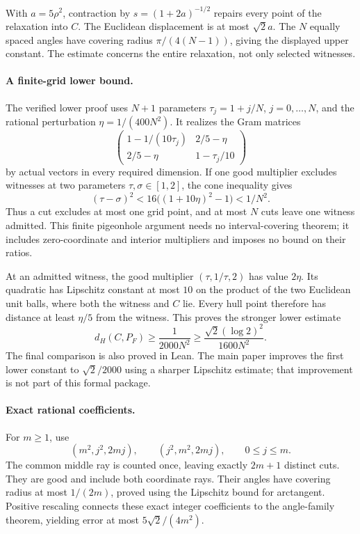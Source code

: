 With $a=5\rho^2$, contraction by $s=(1+2a)^{-1/2}$ repairs every point of
the relaxation into $C$. The Euclidean displacement is at most $\sqrt2a$.
The $N$ equally spaced angles have covering radius
$\pi/(4(N-1))$, giving the displayed upper constant. The estimate concerns
the entire relaxation, not only selected witnesses.

\paragraph{A finite-grid lower bound.}
The verified lower proof uses $N+1$ parameters
$\tau_j=1+j/N$, $j=0,\ldots,N$, and the rational perturbation
$\eta=1/(400N^2)$. It realizes the Gram matrices
\[
 \begin{pmatrix}
 1-1/(10\tau_j)&2/5-\eta\\
 2/5-\eta&1-\tau_j/10
 \end{pmatrix}
\]
by actual vectors in every required dimension. If one good multiplier
excludes witnesses at two parameters $\tau,\sigma\in[1,2]$, the cone
inequality gives
\[
 (\tau-\sigma)^2<16\bigl((1+10\eta)^2-1\bigr)<1/N^2.
\]
Thus a cut excludes at most one grid point, and at most $N$ cuts leave
one witness admitted. This finite pigeonhole argument needs no
interval-covering theorem; it includes zero-coordinate and interior
multipliers and imposes no bound on their ratios.

At an admitted witness, the good multiplier $(\tau,1/\tau,2)$ has value
$2\eta$. Its quadratic has Lipschitz constant at most $10$ on the product
of the two Euclidean unit balls, where both the witness and $C$ lie.
Every hull point therefore has distance at least $\eta/5$ from the
witness. This proves the stronger lower estimate
\[
 d_H(C,P_F)\geq\frac1{2000N^2}
 \geq\frac{\sqrt2(\log2)^2}{1600N^2}.
\]
The final comparison is also proved in Lean. The main paper improves
the first lower constant to $\sqrt2/2000$ using a sharper Lipschitz
estimate; that improvement is not part of this formal package.

\paragraph{Exact rational coefficients.}
For $m\geq1$, use
\[
 (m^2,j^2,2mj),\qquad(j^2,m^2,2mj),\qquad 0\leq j\leq m.
\]
The common middle ray is counted once, leaving exactly $2m+1$ distinct
cuts. They are good and include both coordinate rays. Their angles have
covering radius at most $1/(2m)$, proved using the Lipschitz bound for
arctangent. Positive rescaling connects these exact integer coefficients
to the angle-family theorem, yielding error at most
$5\sqrt2/(4m^2)$.

